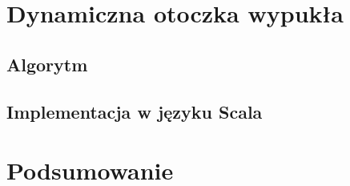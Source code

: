     \chapter{Dynamiczna otoczka wypukła}
    	\section{Algorytm}
    	\section{Implementacja w języku Scala} 
	\chapter{Podsumowanie} 
    \printbibliography[heading=bibintoc]
	\listoffigures
	\lstlistoflistings

